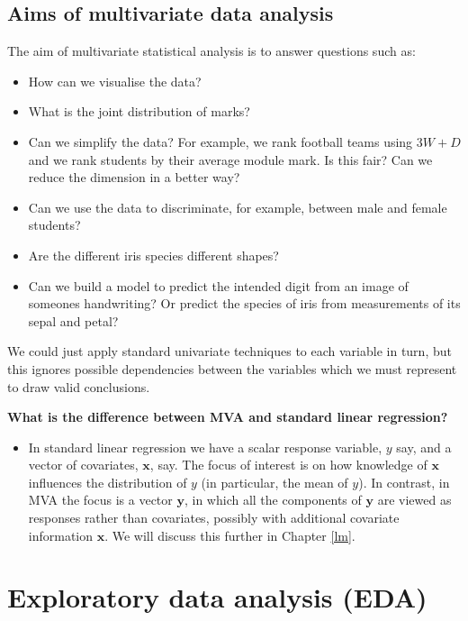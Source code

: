 \documentclass[
]{book}
\providecommand{\tightlist}{%
  \setlength{\itemsep}{0pt}\setlength{\parskip}{0pt}}
\theoremstyle{definition}
\theoremstyle{definition}
\theoremstyle{definition}
\theoremstyle{definition}
\theoremstyle{remark}
\begin{document}
\subsection{Aims of multivariate data analysis}\label{aims-of-multivariate-data-analysis}

The aim of multivariate statistical analysis is to answer questions such as:

\begin{itemize}
\tightlist
\item
  How can we visualise the data?
\item
  What is the joint distribution of marks?
\item
  Can we simplify the data? For example, we rank football teams using \(3W+D\) and we rank students by their average module mark. Is this fair? Can we reduce the dimension in a better way?
\item
  Can we use the data to discriminate, for example, between male and female students?
\item
  Are the different iris species different shapes?
\item
  Can we build a model to predict the intended digit from an image of someones handwriting? Or predict the species of iris from measurements of its sepal and petal?
\end{itemize}

We could just apply standard univariate techniques to each variable in turn, but this ignores possible dependencies between the variables which we must represent to draw valid conclusions.

\textbf{What is the difference between MVA and standard linear regression?}

\begin{itemize}
\tightlist
\item
  In standard linear regression we have a scalar response variable, \(y\) say, and a vector of covariates, \(\mathbf x\), say. The focus of interest is on how knowledge of \(\mathbf x\) influences the distribution of \(y\) (in particular, the mean of \(y\)). In contrast, in MVA the focus is a vector \(\mathbf y\), in which all the components of \(\mathbf y\) are viewed as responses rather than covariates, possibly with additional covariate information \(\mathbf x\). We will discuss this further in Chapter \ref{lm}.
\end{itemize}

\section{Exploratory data analysis (EDA)}\label{exploratory-data-analysis-eda}
\end{document}
